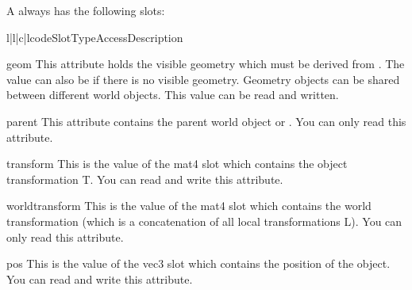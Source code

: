 A  always has the following slots:

\begin{tableiv}{l|l|c|l}{code}{Slot}{Type}{Access}{Description}
\end{tableiv}

\begin{memberdesc}{geom}
This attribute holds the visible geometry which must be derived from 
. The value can also be  if there is no
visible geometry. Geometry objects can be shared between different 
world objects. This value can be read and written.
\end{memberdesc}

\begin{memberdesc}{parent}
This attribute contains the parent world object or . You can 
only read this attribute.
\end{memberdesc}

\begin{memberdesc}{transform}
This is the value of the mat4 slot  which contains
the object transformation T. You can read and write this attribute.
\end{memberdesc}

\begin{memberdesc}{worldtransform}
This is the value of the mat4 slot  which
contains the world transformation (which is a concatenation of all local
transformations L). You can only read this attribute.

\end{memberdesc}

\begin{memberdesc}{pos}
This is the value of the vec3 slot  which contains the 
position of the object. You can read and write this attribute.
\end{memberdesc}

